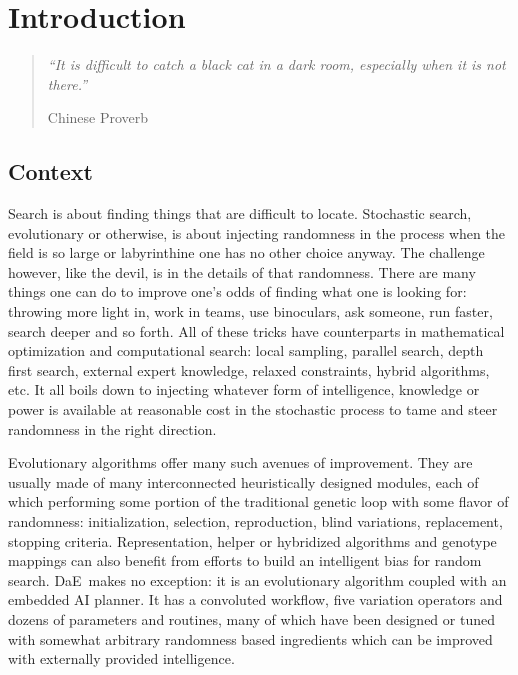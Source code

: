 \documentclass[english]{DESCARWINreport}
\newcommand{\DAE}{{\sc DaE}}
\begin{document}
\tableofcontents

\newpage

\chapter{Introduction}

\begin{quotation}
\emph{``It is difficult to catch a black cat in a dark room, especially when it is not there.''}
\begin{flushright}
Chinese Proverb

\end{flushright}
\end{quotation}

\vspace{0cm}

\section{Context}

Search is about finding things that are difficult to locate. Stochastic search, evolutionary or otherwise, is about injecting randomness in the process when the field is so large or labyrinthine one has no other choice anyway. The challenge however, like the devil, is in the details of that randomness. There are many things one can do to improve one's odds of finding what one is looking for: throwing more light in, work in teams, use binoculars, ask someone, run faster, search deeper and so forth. All of these tricks have counterparts in mathematical optimization and computational search: local sampling, parallel search, depth first search, external expert knowledge, relaxed constraints, hybrid algorithms, etc. It all boils down to injecting whatever form of intelligence, knowledge or power is available at reasonable cost in the stochastic process to tame and steer randomness in the right direction.

Evolutionary algorithms offer many such avenues of improvement. They are usually made of many interconnected heuristically designed modules, each of which performing some portion of the traditional genetic loop with some flavor of randomness: initialization, selection, reproduction, blind variations, replacement, stopping criteria. Representation, helper or hybridized algorithms and genotype mappings can also benefit from efforts to build an intelligent bias for random search. \DAE\ makes no exception: it is an evolutionary algorithm coupled with an embedded AI planner. It has a convoluted workflow, five variation operators and dozens of parameters and routines, many of which have been designed or tuned with somewhat arbitrary randomness based ingredients which can be improved with externally provided intelligence.
\end{document}
